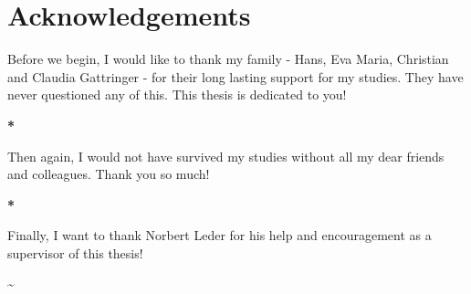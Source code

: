 \chapter*{Acknowledgements}
\begin{center}

\vspace{3.5cm}

Before we begin, I would like to thank my family - Hans, Eva Maria, Christian and Claudia Gattringer - for their long lasting support for my studies. They have never questioned any of this. This thesis is dedicated to you!

\vspace{1.5cm}
\textbf{*}
\vspace{1.5cm}

Then again, I would not have survived my studies without all my dear friends and colleagues. Thank you so much!

\vspace{1.5cm}
\textbf{*}
\vspace{1.5cm}

Finally, I want to thank Norbert Leder for his help and encouragement as a supervisor of this thesis!

\vspace{1.5cm}
\textbf{\~{}}
\vspace{1.5cm}


\end{center}

\pagebreak
\restoregeometry
